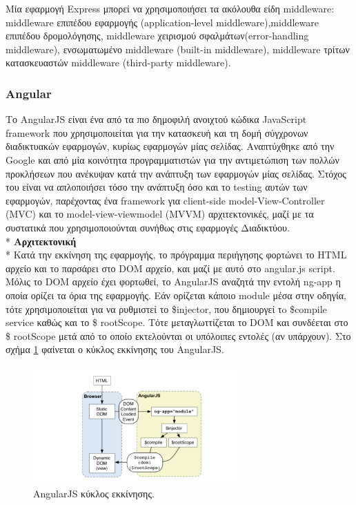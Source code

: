 Μία εφαρμογή Express μπορεί να χρησιμοποιήσει τα ακόλουθα είδη middleware: middleware επιπέδου εφαρμογής (application-level middleware),middleware επιπέδου δρομολόγησης, middleware χειρισμού σφαλμάτων(error-handling middleware), ενσωματωμένο middleware (built-in middleware), middleware τρίτων κατασκευαστών middleware (third-party middleware). 


		\subsubsection{Angular}
		Το AngularJS είναι ένα από τα πιο δημοφιλή ανοιχτού κώδικα JavaScript framework που χρησιμοποιείται για την κατασκευή και τη δομή σύγχρονων διαδικτυακών εφαρμογών, κυρίως εφαρμογών μίας σελίδας. Αναπτύχθηκε από την Google και από μία κοινότητα προγραμματιστών για την αντιμετώπιση των πολλών προκλήσεων που ανέκυψαν κατά την ανάπτυξη των εφαρμογών μίας σελίδας.  Στόχος του είναι να απλοποιήσει τόσο την ανάπτυξη όσο και το testing αυτών των εφαρμογών, παρέχοντας ένα framework για client-side model-View-Controller (MVC) και το model-view-viewmodel (MVVM) αρχιτεκτονικές, μαζί με τα συστατικά που χρησιμοποιούνται συνήθως στις εφαρμογές Διαδικτύου.
	   \\*
			    \textbf{Αρχιτεκτονική}
	 \\*
		Κατά την εκκίνηση της εφαρμογής, το πρόγραμμα περιήγησης φορτώνει το HTML αρχείο και το παρσάρει στο DOM αρχείο, και μαζί με αυτό στο angular.js script. Μόλις το DOM αρχείο έχει φορτωθεί, το AngularJS αναζητά την εντολή ng-app η οποία ορίζει τα όρια της εφαρμογής. Εάν ορίζεται κάποιο module μέσα στην οδηγία, τότε χρησιμοποιείται για να ρυθμιστεί το \$injector, που δημιουργεί τo \$compile service καθώς και το \$ rootScope. Τότε μεταγλωττίζεται το DOM και συνδέεται στο \$ rootScope μετά από το οποίο εκτελούνται οι υπόλοιπες εντολές (αν υπάρχουν). Στο σχήμα \ref{fig:angularjs} φαίνεται ο κύκλος εκκίνησης του AngularJS.
		
	  \begin{figure}[h]
	    \centering
	    \includegraphics[width=0.7\textwidth]{angularjs.png}
	    \caption{AngularJS κύκλος εκκίνησης.}
	    \label{fig:angularjs}
	\end{figure}

